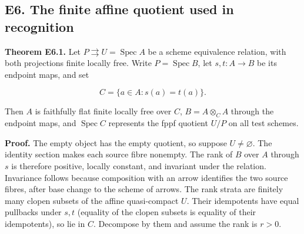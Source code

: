\documentclass[11pt,a4paper,openany]{report}
\newcounter{none}
\begin{document}
\subsection{E6. The finite affine quotient used in recognition}\label{AG-RG-S04-e6.-the-finite-affine-quotient-used-in-recognition}

\textbf{Theorem E6.1.} Let \(P\rightrightarrows U=\operatorname{Spec}A\) be a scheme equivalence relation, with both projections finite locally free. Write \(P=\operatorname{Spec}B\), let \(s,t:A\to B\) be its endpoint maps, and set

\[
C=\{a\in A:s(a)=t(a)\}.
\]

Then \(A\) is faithfully flat finite locally free over \(C\), \(B=A\otimes_C A\) through the endpoint maps, and \(\operatorname{Spec}C\) represents the fppf quotient \(U/P\) on all test schemes.

\textbf{Proof.} The empty object has the empty quotient, so suppose \(U\ne\varnothing\). The identity section makes each source fibre nonempty. The rank of \(B\) over \(A\) through \(s\) is therefore positive, locally constant, and invariant under the relation. Invariance follows because composition with an arrow identifies the two source fibres, after base change to the scheme of arrows. The rank strata are finitely many clopen subsets of the affine quasi-compact \(U\). Their idempotents have equal pullbacks under \(s,t\) (equality of the clopen subsets is equality of their idempotents), so lie in \(C\). Decompose by them and assume the rank is \(r>0\).
\end{document}
